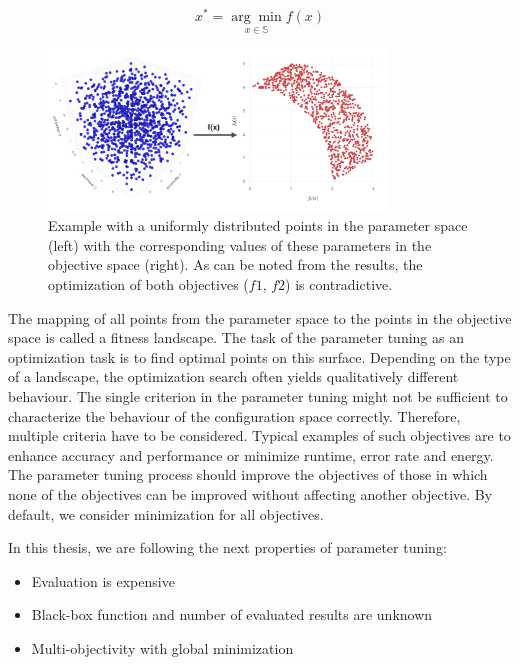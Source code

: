                 \[x^* = \underset{x \in \mathbb{S}}{\arg\min} f(x)\]

        \begin{figure}
            \centering 
            \includegraphics[width=0.8\textwidth]{content/images/utility/spaces}
            \caption[Example with a uniformly distributed points in the parameter space (left) with the corresponding values of these parameters in the objective space]{Example with a uniformly distributed points in the parameter space (left) with the corresponding values of these parameters in the objective space (right). As can be noted from the results, the optimization of both objectives ($f1$, $f2$) is contradictive.} 
            \label{fig:spaces} 
        \end{figure}

        The mapping of all points from the parameter space to the points in the objective space is called a fitness landscape. The task of the parameter tuning as an optimization task is to find optimal points on this surface. Depending on the type of a landscape, the optimization search often yields qualitatively different behaviour.
        The single criterion in the parameter tuning might not be sufficient to characterize the behaviour of the configuration space correctly. Therefore, multiple criteria have to be considered. Typical examples of such objectives are to enhance accuracy and performance or minimize runtime, error rate and energy. The parameter tuning process should improve the objectives of those in which none of the objectives can be improved without affecting another objective. By default, we consider minimization for all objectives. 

        In this thesis, we are following the next properties of parameter tuning:
        \begin{itemize}
            \item Evaluation is expensive
            \item Black-box function and number of evaluated results are unknown
            \item Multi-objectivity with global minimization
        \end{itemize}

